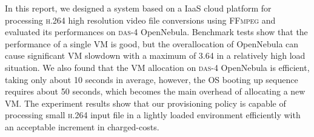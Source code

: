 
In this report, we designed a system based on a IaaS cloud platform
for processing \textsc{h.264} high resolution video file conversions
using
\textsc{FFmpeg} and evaluated its performances on \textsc{das-4}
OpenNebula. Benchmark tests show that the performance of a single VM
is good, but the overallocation of OpenNebula can cause significant
VM slowdown with a maximum of 3.64 in a relatively high load situation.
We also found that the VM allocation on \textsc{das-4} OpenNebula is
efficient, taking only about 10 seconds in average, however, the OS
booting up sequence requires about 50 seconds, which becomes the main
overhead of allocating a new VM.
The experiment results show that our \policysimpleelastic{}
provisioning policy is capable of processing small \textsc{h.264} input
file in a lightly loaded environment efficiently with an acceptable
increment in charged-costs.


